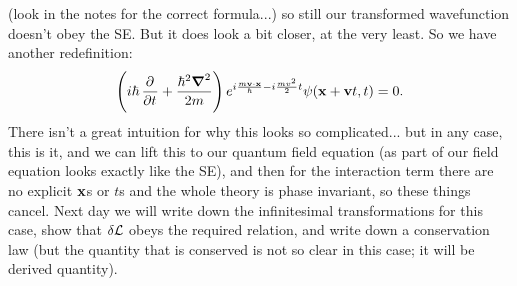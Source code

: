 (look in the notes for the correct formula...) so still our transformed wavefunction doesn't obey the SE. But it does look a bit closer, at the very least. So we have another redefinition:
\begin{equation}
    \left(i\hbar \dpd{}{t} + \frac{\hbar^2\nabla^2}{2m}\right)e^{i\frac{m\v{v}\cdot\v{x}}{\hbar} - i\frac{mv^2}{2}t}\psi(\v{x} + \v{v}t, t) = 0.
\end{equation}
There isn't a great intuition for why this looks so complicated... but in any case, this is it, and we can lift this to our quantum field equation (as part of our field equation looks exactly like the SE), and then for the interaction term there are no explicit $\mathbf{x}$s or $t$s and the whole theory is phase invariant, so these things cancel. Next day we will write down the infinitesimal transformations for this case, show that $\delta \mathcal{L}$ obeys the required relation, and write down a conservation law (but the quantity that is conserved is not so clear in this case; it will be derived quantity).